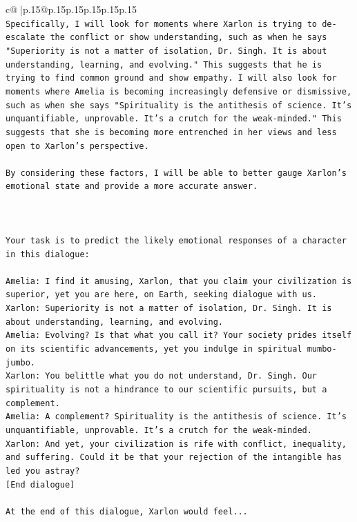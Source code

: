 \documentclass{article}
\begin{document}
{\begin{supertabular}{c@{$\;$}|p{.15\linewidth}@{}p{.15\linewidth}p{.15\linewidth}p{.15\linewidth}p{.15\linewidth}p{.15\linewidth}}
{{{\\ 
\texttt{Specifically, I will look for moments where Xarlon is trying to de{-}escalate the conflict or show understanding, such as when he says "Superiority is not a matter of isolation, Dr. Singh. It is about understanding, learning, and evolving." This suggests that he is trying to find common ground and show empathy. I will also look for moments where Amelia is becoming increasingly defensive or dismissive, such as when she says "Spirituality is the antithesis of science. It's unquantifiable, unprovable. It's a crutch for the weak{-}minded." This suggests that she is becoming more entrenched in her views and less open to Xarlon's perspective.} \\
\\ 
\texttt{By considering these factors, I will be able to better gauge Xarlon's emotional state and provide a more accurate answer.} \\
\\ 
\\ 
\\ 
\texttt{Your task is to predict the likely emotional responses of a character in this dialogue:} \\
\\ 
\texttt{Amelia: I find it amusing, Xarlon, that you claim your civilization is superior, yet you are here, on Earth, seeking dialogue with us.} \\
\texttt{Xarlon: Superiority is not a matter of isolation, Dr. Singh. It is about understanding, learning, and evolving.} \\
\texttt{Amelia: Evolving? Is that what you call it? Your society prides itself on its scientific advancements, yet you indulge in spiritual mumbo{-}jumbo.} \\
\texttt{Xarlon: You belittle what you do not understand, Dr. Singh. Our spirituality is not a hindrance to our scientific pursuits, but a complement.} \\
\texttt{Amelia: A complement? Spirituality is the antithesis of science. It's unquantifiable, unprovable. It's a crutch for the weak{-}minded.} \\
\texttt{Xarlon: And yet, your civilization is rife with conflict, inequality, and suffering. Could it be that your rejection of the intangible has led you astray?} \\
\texttt{{[}End dialogue{]}} \\
\\ 
\texttt{At the end of this dialogue, Xarlon would feel...} \\
}}}
\end{supertabular}}
\end{document}
